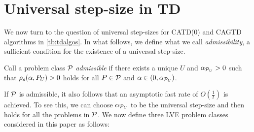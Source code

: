 \section{Universal step-size in TD}\label{sec:rl}
We now turn to the question of universal step-sizes for CATD(0) and CAGTD algorithms in \eqref{tb:tdalgos}. In what follows, we define what we call \emph{admissibility},  a sufficient condition for the existence of a universal step-size. 
\begin{definition}\label{def:admis}
Call a problem class $\P$ \emph{admissible} if there exists a unique $U$ and $\alpha_{\P_U}>0$ such that
$\rhos{P_U}>0$ holds for all $P\in \P$ and $\alpha\in(0,\alpha_{\P_U})$.
\end{definition}
If $\P$ is admissible, it also follows that an asymptotic fast rate of $O(\frac1t)$ is achieved. To see this, we can choose $\alpha_{\P_U}$ to be the universal step-size and then  holds for all the problems in $\P$. We now define three LVE problem classes considered in this paper as follows:
\begin{comment}
\begin{table}
\resizebox{\columnwidth}{!}{
\begin{tabular}{|c|c|c|c|}\hline
Class &Fixed &Variable &Remark\\\hline
$\P_{TDON}$ & $\Phi,S,A,\gamma$ & $\pi,P,R$ &$\mu=d_{\pi}, \EE{\phi_t\phi_t}=\EE{\phi'_t\phi'_t}$\\\hline
$\P_{TDOFF}$ & $\Phi,S,A,\gamma$ & $\pi,\mu,P,R$ &$\mu\neq d_{\pi}, \EE{\phi_t\phi_t}=\EE{\phi'_t\phi'_t}$, $\norm{\phi_t}=1$\\\hline
$\P_{GTDOFF}$ & $\Phi,S,A,\gamma$ & $\pi,\mu,P,R$ &$\mu\neq d_{\pi}$\\\hline
\end{tabular}
}
\end{table}
\end{comment}
\FloatBarrier
\begin{table}[h]
\caption{Here, $S,A,\gamma$ are fixed across all the class and the second column shows the quantities that vary across the respective classes. These three capture \emph{on/off-policy} learning scenarios arising in RL.}
\end{table}
